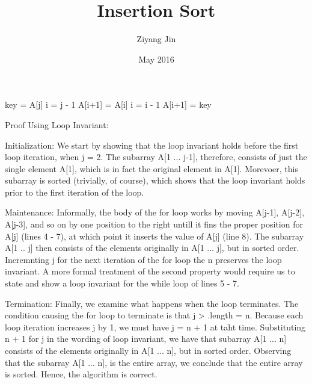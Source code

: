 \documentclass{article}
\title{Insertion Sort}
\author{Ziyang Jin}
\date{May 2016}
\begin{document}
\begin{algorithm}
\begin{algorithmic}[1]
    \State key = A[j]
    \State i = j - 1
      \State A[i+1] = A[i]
      \State i = i - 1
    \EndWhile
    \State A[i+1] = key
\EndFor
\EndProcedure
\end{algorithmic}
\end{algorithm}

Proof Using Loop Invariant:\par
  Initialization: We start by showing that the loop invariant holds before the first loop iteration, when j = 2. The subarray A[1 ... j-1], therefore, consists of just the single element A[1], which is in fact the original element in A[1]. Morevoer, this subarray is sorted (trivially, of course), which shows that the loop invariant holds prior to the first iteration of the loop.
  
  Maintenance: Informally, the body of the for loop works by moving A[j-1], A[j-2], A[j-3], and so on by one position to the right untill it fins the proper position for A[j] (lines 4 - 7), at which point it inserts the value of A[j] (line 8). The subarray A[1 .. j] then consists of the elements originally in A[1 ... j], but in sorted order. Incremnting j for the next iteration of the for loop the n preserves the loop invariant.
    A more formal treatment of the second property would require us to state and show a loop invariant for the while loop of lines 5 - 7.
  
  Termination: Finally, we examine what happens when the loop terminates. The condition causing the for loop to terminate is that j > .length = n. Because each loop iteration increases j by 1, we must have j = n + 1 at taht time. Substituting n + 1 for j in the wording of loop invariant, we have that subarray A[1 ... n] consists of the elements originally in A[1 ... n], but in sorted order. Observing that the subarray A[1 ... n], is the entire array, we conclude that the entire array is sorted. Hence, the algorithm is correct.
\end{document}
